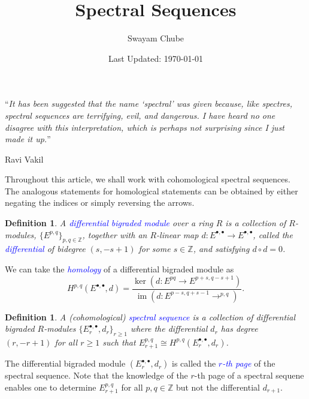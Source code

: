 \documentclass[11pt]{article}
\theoremstyle{thmstyle}
\theoremstyle{defstyle}
\newtheorem{definition}[theorem]{Definition}
\newcommand{\Z}{\mathbb{Z}}
\newcommand{\im}{\operatorname{im}}
\newcommand{\define}[1]{\textcolor{blue}{\textit{#1}}}
\renewcommand{\ge}{\geqslant}
\begin{document}
\title{Spectral Sequences}
\author{Swayam Chube}
\date{Last Updated: \today}
\maketitle
\epigraph{``\emph{It has been suggested that the name `spectral' was given because, like spectres, spectral sequences are terrifying, evil, and dangerous. I have heard no one disagree with this interpretation, which is perhaps not surprising since I just made it up.}''}{Ravi Vakil}

Throughout this article, we shall work with cohomological spectral sequences. The analogous statements for homological statements can be obtained by either negating the indices or simply reversing the arrows.

\begin{definition}
    A \define{differential bigraded module} over a ring $R$ is a collection of $R$-modules, $\{E^{p, q}\}_{p, q\in\Z}$, together with an $R$-linear map $d\colon E^{\bullet,\bullet}\to E^{\bullet,\bullet}$, called the \define{differential} of bidegree $(s, -s + 1)$ for some $s\in\Z$, and satisfying $d\circ d = 0$.
\end{definition}

We can take the \define{homology} of a differential bigraded module as 
\begin{equation*}
    H^{p, q}\left(E^{\bullet, \bullet}, d\right) = \frac{\ker\left(d\colon E^{p q}\to E^{p + s, q - s + 1}\right)}{\im\left(d\colon E^{p - s, q + s - 1}\to ^{p, q}\right)}.
\end{equation*}

\begin{definition}
    A (cohomological) \define{spectral sequence} is a collection of differential bigraded $R$-modules $\{E_r^{\bullet,\bullet}, d_r\}_{r\ge 1}$ where the differential $d_r$ has degree $(r, -r + 1)$ for all $r\ge 1$ such that $E^{p, q}_{r + 1}\cong H^{p, q}\left(E^{\bullet,\bullet}_r, d_r\right)$.
\end{definition}

The differential bigraded module $(E^{\bullet,\bullet}_r, d_r)$ is called the \define{$r$-th page} of the spectral sequence. Note that the knowledge of the $r$-th page of a spectral sequene enables one to determine $E^{p, q}_{r + 1}$ for all $p, q\in\Z$ but not the differential $d_{r + 1}$.
\end{document}

